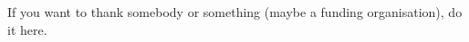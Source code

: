 \documentclass[12pt]{article}
\begin{document}
If you want to thank somebody or something (maybe a funding organisation), do it here.

%
%
%


%
%
%
%
%
\appendix
\end{document}
